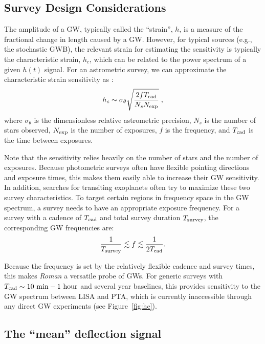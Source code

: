 \documentclass[12pt]{article}
\def\roman{\textit{Roman}\xspace}
\begin{document}
\subsection*{Survey Design Considerations}
The amplitude of a GW, typically called the ``strain'', $h$, is a measure of the fractional change in length caused by a GW. However, for typical sources (e.g., the stochastic GWB), the relevant strain for estimating the sensitivity is typically the characteristic strain, $h_c$, which can be related to the power spectrum of a given $h(t)$ signal. For an astrometric survey, we can approximate the characteristic strain sensitivity as \citep{Wang2022}:
\begin{equation}
    h_c \sim \sigma_\theta \sqrt{\frac{2fT_{\rm{cad}}}{N_s N_{\rm{exp}}}} \; ,
\end{equation}
where $\sigma_\theta$ is the dimensionless relative astrometric precision, $N_s$ is the number of stars observed, $N_{\rm{exp}}$ is the number of exposures, $f$ is the frequency, and $T_{\rm{cad}}$ is the time between exposures.

Note that the sensitivity relies heavily on the number of stars and the number of exposures. Because photometric surveys often have flexible pointing directions and exposure times, this makes them easily able to increase their GW sensitivity. In addition, searches for transiting exoplanets often try to maximize these two survey characteristics. To target certain regions in frequency space in the GW spectrum, a survey needs to have an appropriate exposure frequency. For a survey with a cadence of $T_{\rm{cad}}$ and total survey duration $T_{\rm{survey}}$, the corresponding GW frequencies are:
\begin{equation}
    \frac{1}{T_{\rm{survey}}} \lesssim f \lesssim \frac{1}{2T_{\rm{cad}}}.
\end{equation}

Because the frequency is set by the relatively flexible cadence and survey times, this makes \roman a versatile probe of GWs. For generic surveys with $T_{\rm{cad}} \sim 10~\rm{min} - 1~\rm{hour}$ and several year baselines, this provides sensitivity to the GW spectrum between LISA and PTA, which is currently inaccessible through any direct GW experiments (see Figure~\ref{fig:hc}).

\subsection*{The ``mean'' deflection signal}
\end{document}
